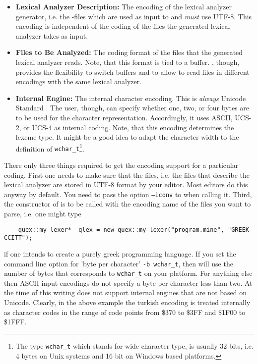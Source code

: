 \begin{itemize}
    \item {\bf Lexical Analyzer Description:} The encoding of the lexical analyzer generator, i.e. the {\quex}-files
          which are used as input to {\quex} and {\it must} use UTF-8.
          This encoding is independent of the coding of the files the generated
          lexical analyzer takes as input.

    \item {\bf Files to Be Analyzed:} The coding
          format of the files that the generated lexical analyzer reads. Note, that
          this format is tied to a buffer. {\Quex}, though, provides the flexibility
          to switch buffers and to allow to read files in different encodings 
          with the same lexical analyzer.

    \item {\bf Internal Engine:} The internal character encoding. This is {\it always} Unicode Standard \cite{}. 
          The user, though, can specify whether one, two, or four bytes are to be used 
          for the character representation. Accordingly, it uses ASCII, UCS-2, or UCS-4
          as internal coding. Note, that this encoding determines the lexeme type. 
          It might be a good idea to adapt the character width to the definition of
          {\tt wchar\_t}\footnote{The type {\tt wchar\_t} which stands for wide character type, is usually
          32 bits, i.e. 4 bytes on Unix systems and 16 bit on Windows based platforms.}. 
        
\end{itemize}

There only three things required to get the encoding support for a particular coding. First
one needs to make sure that the {\quex} files, i.e. the files that describe the lexical
analyzer are stored in UTF-8 format by your editor. Most editors do this anyway by default.
You need to pass the option {\tt --iconv} to {\quex} when calling it. Third, the constructor
of {\quex} is to be called with the encoding name of the files you want to parse, i.e. one might
type

\begin{lstlisting}
    quex::my_lexer*  qlex = new quex::my_lexer("program.mine", "GREEK-CCITT");
\end{lstlisting}

if one intends to create a purely greek programming language. If you set the command
line option for 'byte per character' {\tt -b wchar\_t}, then {\quex} will use
the number of bytes that corresponds to {\tt wchar\_t} on your platform. For
anything else then ASCII input encodings do not specify a byte per character
less than two.  At the time of this writing {\quex} does not support internal
engines that are not based on Unicode. Clearly, in the above example the turkish
encoding is treated internally as character codes in the range of code points from 
\$370 to \$3FF and \$1F00 to \$1FFF.
